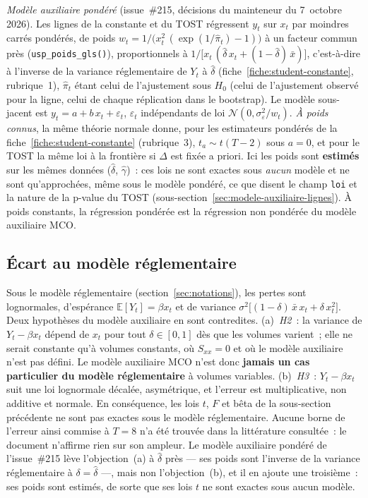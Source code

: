 \documentclass[a4paper,11pt]{article}
\newcommand{\code}[1]{\texttt{\small #1}}
\begin{document}
\emph{Modèle auxiliaire pondéré} (issue~\#215, décisions du mainteneur du 7~octobre 2026). Les
lignes de la constante et du TOST régressent $y_t$ sur $x_t$ par moindres carrés pondérés, de
poids $w_t = 1/\big(x_t^2\,(\exp(1/\hat\pi_t) - 1)\big)$ à un facteur commun près
(\code{usp\_poids\_gls()}), proportionnels à $1/\big[x_t\,(\hat\delta\,x_t + (1-\hat\delta)\,\bar
x)\big]$, c'est-à-dire à l'inverse de la variance réglementaire de $Y_t$ à $\hat\delta$
(fiche~\ref{fiche:student-constante}, rubrique~1), $\hat\pi_t$ étant celui de l'ajustement sous
$H_0$ (celui de l'ajustement observé pour la ligne, celui de chaque réplication dans le
bootstrap). Le modèle
sous-jacent est $y_t = a + b\,x_t + \varepsilon_t$, $\varepsilon_t$ indépendants de loi
$\mathcal{N}(0, \sigma_\varepsilon^2/w_t)$. \emph{À poids connus}, la même théorie normale donne,
pour les estimateurs pondérés de la fiche~\ref{fiche:student-constante} (rubrique~3), $t_a \sim
t(T-2)$ sous $a = 0$, et pour le TOST la même loi à la frontière si $\Delta$ est fixée a priori. Ici
les poids sont \textbf{estimés} sur les mêmes données ($\hat\delta$, $\hat\gamma$)~: ces lois ne
sont exactes sous \emph{aucun} modèle et ne sont qu'approchées, même sous le modèle pondéré, ce que
disent le champ \code{loi} et la nature de la p-value du TOST (sous-section~\ref{sec:modele-auxiliaire-lignes}).
À poids constants, la régression pondérée est la régression non pondérée du modèle
auxiliaire MCO.

\subsection{Écart au modèle réglementaire}
\label{sec:modele-auxiliaire-ecart}

Sous le modèle réglementaire (section~\ref{sec:notations}), les pertes sont lognormales,
d'espérance $\mathbb{E}[Y_t] = \beta x_t$ et de variance
$\sigma^2\big[(1-\delta)\,\bar x\, x_t + \delta\, x_t^2\big]$. Deux hypothèses du modèle
auxiliaire en sont contredites. (a)~\emph{H2}~: la variance de $Y_t - \beta x_t$ dépend de $x_t$
pour tout $\delta \in [0, 1]$ dès que les volumes varient~; elle ne serait constante qu'à volumes
constants, où $S_{xx} = 0$ et où le modèle auxiliaire n'est pas défini. Le modèle auxiliaire MCO
n'est donc \textbf{jamais un cas particulier du modèle réglementaire} à volumes variables.
(b)~\emph{H3}~: $Y_t - \beta x_t$ suit une loi lognormale décalée, asymétrique, et l'erreur est
multiplicative, non additive et normale. En conséquence, les lois $t$, $F$ et bêta de la
sous-section précédente ne sont pas exactes sous le modèle réglementaire. Aucune borne de
l'erreur ainsi commise à $T = 8$ n'a été trouvée dans la littérature consultée~: le document
n'affirme rien sur son ampleur. Le modèle auxiliaire pondéré de l'issue~\#215 lève
l'objection~(a) à $\hat\delta$ près --- ses poids sont l'inverse de la variance réglementaire à
$\delta = \hat\delta$ ---, mais non l'objection~(b), et il en ajoute une troisième~: ses poids sont
estimés, de sorte que ses lois $t$ ne sont exactes sous aucun modèle.
\end{document}
